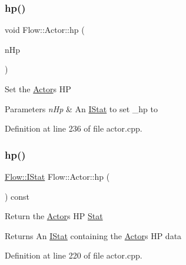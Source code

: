 \subsubsection{\texorpdfstring{hp()}{hp()}\hspace{0.1cm}{\footnotesize\ttfamily [2/3]}}
{\footnotesize\ttfamily void Flow\+::\+Actor\+::hp (\begin{DoxyParamCaption}\item[{const \hyperlink{class_flow_1_1_i_stat}{I\+Stat} \&}]{n\+Hp }\end{DoxyParamCaption})}

Set the \hyperlink{class_flow_1_1_actor}{Actor}\textquotesingle{}s HP 
\begin{DoxyParams}{Parameters}
{\em n\+Hp} & An \hyperlink{class_flow_1_1_i_stat}{I\+Stat} to set \+\_\+hp to \\
\hline
\end{DoxyParams}


Definition at line 236 of file actor.\+cpp.

\hypertarget{class_flow_1_1_actor_aaea76048a01d31bfc82a0eeb53c5cbdb}{}\label{class_flow_1_1_actor_aaea76048a01d31bfc82a0eeb53c5cbdb} 
\subsubsection{\texorpdfstring{hp()}{hp()}\hspace{0.1cm}{\footnotesize\ttfamily [3/3]}}
{\footnotesize\ttfamily \hyperlink{class_flow_1_1_i_stat}{Flow\+::\+I\+Stat} Flow\+::\+Actor\+::hp (\begin{DoxyParamCaption}{ }\end{DoxyParamCaption}) const}

Return the \hyperlink{class_flow_1_1_actor}{Actor}\textquotesingle{}s HP \hyperlink{class_flow_1_1_stat}{Stat} \begin{DoxyReturn}{Returns}
An \hyperlink{class_flow_1_1_i_stat}{I\+Stat} containing the \hyperlink{class_flow_1_1_actor}{Actor}\textquotesingle{}s HP data 
\end{DoxyReturn}


Definition at line 220 of file actor.\+cpp.

\hypertarget{class_flow_1_1_actor_ae4cb3aadfe983b6bee09b27649dbb704}{}\label{class_flow_1_1_actor_ae4cb3aadfe983b6bee09b27649dbb704} 

